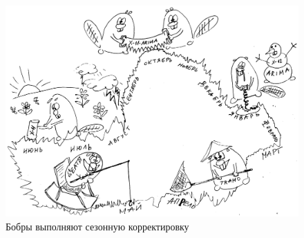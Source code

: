 \documentclass[final,pdftex]{../../template/epsilonj}
\begin{document}
\setcounter{page}{56}










\begin{figure}[hbtp]
\caption{Бобры выполняют сезонную корректировку}
\centering
\includegraphics[scale=0.6]{bobr_final.png}
\end{figure}
\end{document}
